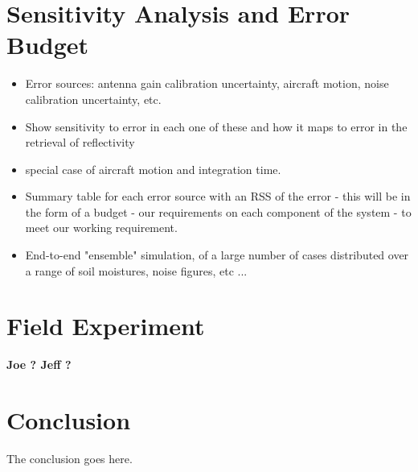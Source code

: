 \documentclass[draftcls,onecolumn]{IEEEtran}  %
\begin{document}
\section{Sensitivity Analysis and Error Budget}
   \begin{itemize}
     \item Error sources: antenna gain calibration uncertainty, aircraft motion, noise calibration uncertainty, etc.
     \item Show sensitivity to error in each one of these and how it maps to error in the retrieval of reflectivity
     \item special case of aircraft motion and integration time.
     \item Summary table for each error source with an RSS of the error - this will be in the form of a budget - our requirements on each component of the system - to meet our working requirement.
     \item End-to-end "ensemble" simulation, of a large number of cases distributed over a range of soil moistures, noise figures, etc ...
   \end{itemize}
   
   
\section{Field Experiment}
   \bf Joe ? Jeff ? \rm 


\section{Conclusion}
The conclusion goes here.






%
\end{document}
